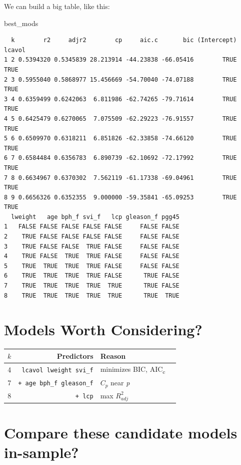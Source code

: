 \documentclass[]{book}
\newenvironment{Shaded}{\begin{snugshade}}{\end{snugshade}}
\newcommand{\NormalTok}[1]{#1}
\theoremstyle{definition}
\theoremstyle{definition}
\theoremstyle{definition}
\theoremstyle{remark}
\begin{document}
We can build a big table, like this:

\begin{Shaded}
\begin{Highlighting}[]
\NormalTok{best_mods}
\end{Highlighting}
\end{Shaded}

\begin{verbatim}
  k        r2     adjr2        cp     aic.c       bic (Intercept) lcavol
1 2 0.5394320 0.5345839 28.213914 -44.23838 -66.05416        TRUE   TRUE
2 3 0.5955040 0.5868977 15.456669 -54.70040 -74.07188        TRUE   TRUE
3 4 0.6359499 0.6242063  6.811986 -62.74265 -79.71614        TRUE   TRUE
4 5 0.6425479 0.6270065  7.075509 -62.29223 -76.91557        TRUE   TRUE
5 6 0.6509970 0.6318211  6.851826 -62.33858 -74.66120        TRUE   TRUE
6 7 0.6584484 0.6356783  6.890739 -62.10692 -72.17992        TRUE   TRUE
7 8 0.6634967 0.6370302  7.562119 -61.17338 -69.04961        TRUE   TRUE
8 9 0.6656326 0.6352355  9.000000 -59.35841 -65.09253        TRUE   TRUE
  lweight   age bph_f svi_f   lcp gleason_f pgg45
1   FALSE FALSE FALSE FALSE FALSE     FALSE FALSE
2    TRUE FALSE FALSE FALSE FALSE     FALSE FALSE
3    TRUE FALSE FALSE  TRUE FALSE     FALSE FALSE
4    TRUE FALSE  TRUE  TRUE FALSE     FALSE FALSE
5    TRUE  TRUE  TRUE  TRUE FALSE     FALSE FALSE
6    TRUE  TRUE  TRUE  TRUE FALSE      TRUE FALSE
7    TRUE  TRUE  TRUE  TRUE  TRUE      TRUE FALSE
8    TRUE  TRUE  TRUE  TRUE  TRUE      TRUE  TRUE
\end{verbatim}

\section{Models Worth Considering?}\label{models-worth-considering}

\begin{longtable}[]{@{}rrll@{}}
\toprule
\(k\) & Predictors & Reason\tabularnewline
\midrule
\endhead
4 & \texttt{lcavol\ lweight\ svi\_f} & minimizes BIC,
AIC\textsubscript{c}\tabularnewline
7 & \texttt{+\ age\ bph\_f\ gleason\_f} & \(C_p\) near
\emph{p}\tabularnewline
8 & \texttt{+\ lcp} & max \(R^2_{adj}\)\tabularnewline
\bottomrule
\end{longtable}

\section{Compare these candidate models
in-sample?}\label{compare-these-candidate-models-in-sample}
\end{document}
